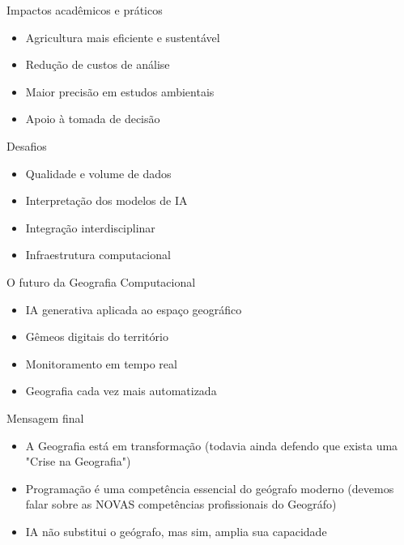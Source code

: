 \documentclass{beamer}
\begin{document}
\begin{frame}{Impactos acadêmicos e práticos}
\begin{itemize}
    \item Agricultura mais eficiente e sustentável
    \item Redução de custos de análise
    \item Maior precisão em estudos ambientais
    \item Apoio à tomada de decisão
\end{itemize}
\end{frame}

\begin{frame}{Desafios}
\begin{itemize}
    \item Qualidade e volume de dados
    \item Interpretação dos modelos de IA
    \item Integração interdisciplinar
    \item Infraestrutura computacional
\end{itemize}
\end{frame}

\begin{frame}{O futuro da Geografia Computacional}
\begin{itemize}
    \item IA generativa aplicada ao espaço geográfico
    \item Gêmeos digitais do território
    \item Monitoramento em tempo real
    \item Geografia cada vez mais automatizada
\end{itemize}
\end{frame}

\begin{frame}{Mensagem final}
\begin{itemize}
    \item A Geografia está em transformação (todavia ainda defendo que exista uma "Crise na Geografia")
    \item Programação é uma competência essencial do geógrafo moderno (devemos falar sobre as NOVAS competências profissionais do Geográfo)
    \item IA não substitui o geógrafo, mas sim, amplia sua capacidade
\end{itemize}
\end{frame}
\end{document}
